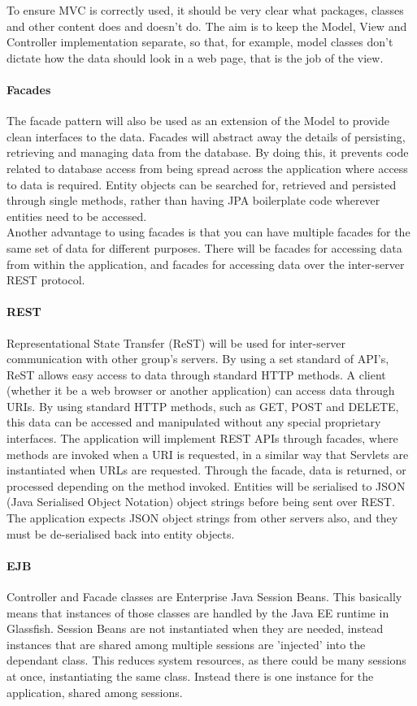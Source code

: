 To ensure MVC is correctly used, it should be very clear what packages, classes and other content does and doesn't do. The aim is to keep the Model, View and Controller implementation separate, so that, for example, model classes don't dictate how the data should look in a web page, that is the job of the view.

\paragraph{Facades}
The facade pattern will also be used as an extension of the Model to provide clean interfaces to the data. Facades will abstract away the details of persisting, retrieving and managing data from the database. By doing this, it prevents code related to database access from being spread across the application where access to data is required. Entity objects can be searched for, retrieved and persisted through single methods, rather than having JPA boilerplate code wherever entities need to be accessed.\\

Another advantage to using facades is that you can have multiple facades for the same set of data for different purposes. There will be facades for accessing data from within the application, and facades for accessing data over the inter-server REST protocol.

\paragraph{REST}
Representational State Transfer (ReST) will be used for inter-server communication with other group's servers. By using a set standard of API's, ReST allows easy access to data through standard HTTP methods. A client (whether it be a web browser or another application) can access data through URIs. By using standard HTTP methods, such as GET, POST and DELETE, this data can be accessed and manipulated without any special proprietary interfaces. The application will implement REST APIs through facades, where methods are invoked when a URI is requested, in a similar way that Servlets are instantiated when URLs are requested. Through the facade, data is returned, or processed depending on the method invoked. Entities will be serialised to JSON (Java Serialised Object Notation) object strings before being sent over REST. The application expects JSON object strings from other servers also, and they must be de-serialised back into entity objects.

\paragraph{EJB}
Controller and Facade classes are Enterprise Java Session Beans. This basically means that instances of those classes are handled by the Java EE runtime in Glassfish. Session Beans are not instantiated when they are needed, instead instances that are shared among multiple sessions are 'injected' into the dependant class. This reduces system resources, as there could be many sessions at once, instantiating the same class. Instead there is one instance for the application, shared among sessions.

